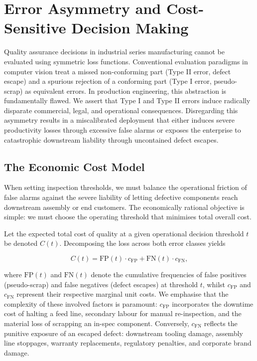 \section{Error Asymmetry and Cost-Sensitive Decision Making}
\label{sec:cost_model}

Quality assurance decisions in industrial series manufacturing cannot be evaluated using symmetric loss functions. Conventional evaluation paradigms in computer vision treat a missed non-conforming part (Type II error, defect escape) and a spurious rejection of a conforming part (Type I error, pseudo-scrap) as equivalent errors. In production engineering, this abstraction is fundamentally flawed. We assert that Type I and Type II errors induce radically disparate commercial, legal, and operational consequences. Disregarding this asymmetry results in a miscalibrated deployment that either induces severe productivity losses through excessive false alarms or exposes the enterprise to catastrophic downstream liability through uncontained defect escapes.

\subsection{The Economic Cost Model}

When setting inspection thresholds, we must balance the operational friction of false alarms against the severe liability of letting defective components reach downstream assembly or end customers. The economically rational objective is simple: we must choose the operating threshold that minimises total overall cost. 

Let the expected total cost of quality at a given operational decision threshold $t$ be denoted $C(t)$. Decomposing the loss across both error classes yields

\begin{equation}
    C(t) = \mathrm{FP}(t) \cdot c_{\mathrm{FP}} + \mathrm{FN}(t) \cdot c_{\mathrm{FN}},
    \label{eq:cost}
\end{equation}

where $\mathrm{FP}(t)$ and $\mathrm{FN}(t)$ denote the cumulative frequencies of false positives (pseudo-scrap) and false negatives (defect escapes) at threshold $t$, whilst $c_{\mathrm{FP}}$ and $c_{\mathrm{FN}}$ represent their respective marginal unit costs. We emphasise that the complexity of these involved factors is paramount: $c_{\mathrm{FP}}$ incorporates the downtime cost of halting a feed line, secondary labour for manual re-inspection, and the material loss of scrapping an in-spec component. Conversely, $c_{\mathrm{FN}}$ reflects the punitive exposure of an escaped defect: downstream tooling damage, assembly line stoppages, warranty replacements, regulatory penalties, and corporate brand damage.

